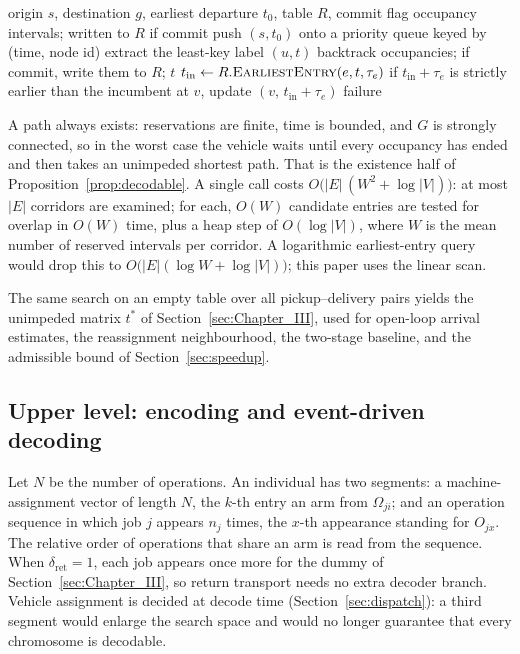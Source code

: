 \begin{algorithm}[t]
  \caption{\textsc{Route}: conflict-free planning of a single leg}
  \label{alg:route}
  \footnotesize
  \begin{algorithmic}[1]
  \Require origin $s$, destination $g$, earliest departure $t_0$, table $R$, commit flag
  \Ensure occupancy intervals; written to $R$ if commit
  \State push $(s,t_0)$ onto a priority queue keyed by (time, node id)
    \State extract the least-key label $(u,t)$
      \State backtrack occupancies; if commit, write them to $R$; \Return $t$
    \EndIf
      \State $t_{\text{in}} \gets R.\textsc{EarliestEntry}(e,t,\tau_e)$
      \State if $t_{\text{in}}+\tau_e$ is strictly earlier than the incumbent at $v$, update $(v,\,t_{\text{in}}+\tau_e)$
    \EndFor
  \EndWhile
  \State \Return failure 
  \end{algorithmic}
\end{algorithm}

A path always exists: reservations are finite, time is bounded, and $G$ is strongly connected, so in the worst case the vehicle waits until every occupancy has ended and then takes an unimpeded shortest path.
That is the existence half of Proposition~\ref{prop:decodable}.
A single call costs $O\bigl(|E|\,(W^{2}+\log|V|)\bigr)$: at most $|E|$ corridors are examined; for each, $O(W)$ candidate entries are tested for overlap in $O(W)$ time, plus a heap step of $O(\log|V|)$, where $W$ is the mean number of reserved intervals per corridor.
A logarithmic earliest-entry query would drop this to $O\bigl(|E|(\log W+\log|V|)\bigr)$; this paper uses the linear scan.

The same search on an empty table over all pickup--delivery pairs yields the unimpeded matrix $t^{*}$ of Section~\ref{sec:Chapter_III}, used for open-loop arrival estimates, the reassignment neighbourhood, the two-stage baseline, and the admissible bound of Section~\ref{sec:speedup}.


\subsection{Upper level: encoding and event-driven decoding}
\label{sec:upper}

Let $N$ be the number of operations.
An individual has two segments: a machine-assignment vector of length $N$, the $k$-th entry an arm from $\Omega_{ji}$; and an operation sequence in which job $j$ appears $n_j$ times, the $x$-th appearance standing for $O_{jx}$.
The relative order of operations that share an arm is read from the sequence.
When $\delta_{\mathrm{ret}}=1$, each job appears once more for the dummy of Section~\ref{sec:Chapter_III}, so return transport needs no extra decoder branch.
Vehicle assignment is decided at decode time (Section~\ref{sec:dispatch}): a third segment would enlarge the search space and would no longer guarantee that every chromosome is decodable.


